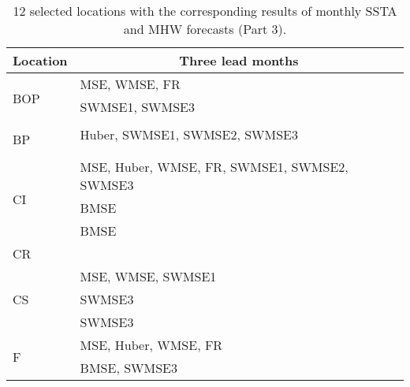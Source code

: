 \documentclass[11pt, a4paper]{article}
\begin{document}
\begin{table}[H]
\centering
\footnotesize
\caption{12 selected locations with the corresponding results of monthly SSTA and MHW forecasts (Part 3).}
\begin{tabular}{ll}
\multicolumn{1}{c}{\textbf{Location}} & \multicolumn{1}{c}{\textbf{Three lead months}} \\ \hline
\multirow{3}{*}{BOP}                  & MSE, WMSE, FR                                  \\
                                      & SWMSE1, SWMSE3                                 \\
                                      &                                                \\ \hline
\multirow{3}{*}{BP}                   & Huber, SWMSE1, SWMSE2, SWMSE3                  \\
                                      &                                                \\
                                      &                                                \\ \hline
\multirow{3}{*}{CI}                   & MSE, Huber, WMSE, FR, SWMSE1, SWMSE2, SWMSE3   \\
                                      & BMSE                                           \\
                                      & BMSE                                           \\ \hline
\multirow{3}{*}{CR}                   &                                                \\
                                      &                                                \\
                                      &                                                \\ \hline
\multirow{3}{*}{CS}                   & MSE, WMSE, SWMSE1                              \\
                                      & SWMSE3                                         \\
                                      & SWMSE3                                         \\ \hline
\multirow{3}{*}{F}                    & MSE, Huber, WMSE, FR                           \\
                                      & BMSE, SWMSE3                                   \\

\end{tabular}
\end{table}
\end{document}
